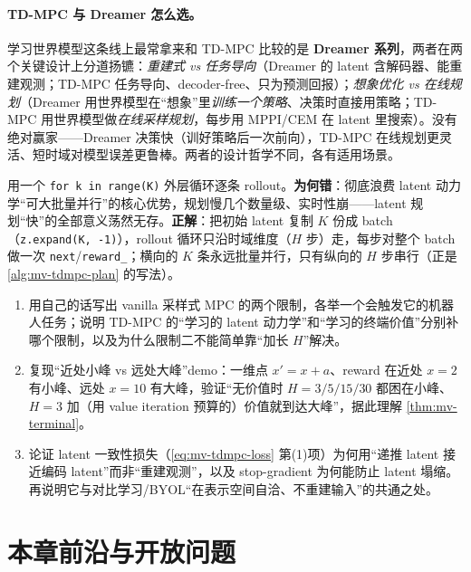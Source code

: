 \paragraph{TD-MPC 与 Dreamer 怎么选。}
学习世界模型这条线上最常拿来和 TD-MPC 比较的是 \textbf{Dreamer 系列}\cite{hafner2023dreamerv3}，两者在两个关键设计上分道扬镳：\emph{重建式 vs 任务导向}（Dreamer 的 latent 含解码器、能重建观测；TD-MPC 任务导向、decoder-free、只为预测回报）；\emph{想象优化 vs 在线规划}（Dreamer 用世界模型在“想象”里\emph{训练一个策略}、决策时直接用策略；TD-MPC 用世界模型做\emph{在线采样规划}，每步用 MPPI/CEM 在 latent 里搜索）。没有绝对赢家——Dreamer 决策快（训好策略后一次前向），TD-MPC 在线规划更灵活、短时域对模型误差更鲁棒。两者的设计哲学不同，各有适用场景。

\begin{pitfall}
用一个 \texttt{for k in range(K)} 外层循环逐条 rollout。\textbf{为何错}：彻底浪费 latent 动力学“可大批量并行”的核心优势，规划慢几个数量级、实时性崩——latent 规划“快”的全部意义荡然无存。\textbf{正解}：把初始 latent 复制 $K$ 份成 batch（\texttt{z.\allowbreak expand(K, -1)}），rollout 循环只沿时域维度（$H$ 步）走，每步对整个 batch 做一次 \texttt{next}/\allowbreak\texttt{reward\_}；横向的 $K$ 条永远批量并行，只有纵向的 $H$ 步串行（正是 \cref{alg:mv-tdmpc-plan} 的写法）。
\end{pitfall}

\begin{practice}
\begin{enumerate}
  \item 用自己的话写出 vanilla 采样式 MPC 的两个限制，各举一个会触发它的机器人任务；说明 TD-MPC 的“学习的 latent 动力学”和“学习的终端价值”分别补哪个限制，以及为什么限制二不能简单靠“加长 $H$”解决。
  \item 复现“近处小峰 vs 远处大峰”demo：一维点 $x'=x+a$、reward 在近处 $x=2$ 有小峰、远处 $x=10$ 有大峰，验证“无价值时 $H=3/5/15/30$ 都困在小峰、$H=3$ 加（用 value iteration 预算的）价值就到达大峰”，据此理解 \cref{thm:mv-terminal}。
  \item 论证 latent 一致性损失（\cref{eq:mv-tdmpc-loss} 第(1)项）为何用“递推 latent 接近编码 latent”而非“重建观测”，以及 stop-gradient 为何能防止 latent 塌缩。再说明它与对比学习/BYOL“在表示空间自洽、不重建输入”的共通之处。
\end{enumerate}
\end{practice}

\section*{本章前沿与开放问题}
\label{sec:mv-frontier}

